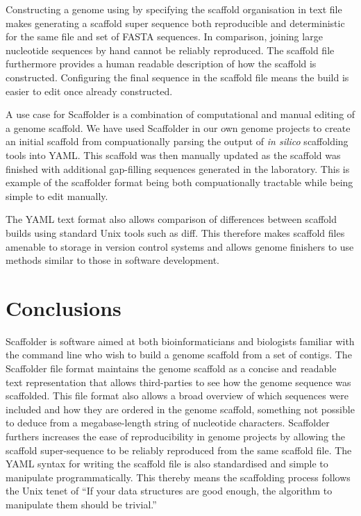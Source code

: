 \documentclass[10pt]{bmc_article}
\newenvironment{bmcformat}{\begin{raggedright}\baselineskip20pt\sloppy\setboolean{publ}{false}}{\end{raggedright}\baselineskip20pt\sloppy}
\begin{document}
\begin{bmcformat}
Constructing a genome using by specifying the scaffold organisation in text
file makes generating a scaffold super sequence both reproducible and
deterministic for the same file and set of FASTA sequences. In comparison,
joining large nucleotide sequences by hand cannot be reliably reproduced. The
scaffold file furthermore provides a human readable description of how the
scaffold is constructed. Configuring the final sequence in the scaffold file
means the build is easier to edit once already constructed. \pb

A use case for Scaffolder is a combination of computational and manual editing
of a genome scaffold. We have used Scaffolder in our own genome projects to
create an initial scaffold from compuationally parsing the output of \emph{in
silico} scaffolding tools into YAML. This scaffold was then manually updated as
the scaffold was finished with additional gap-filling sequences generated in
the laboratory. This is example of the scaffolder format being both
compuationally tractable while being simple to edit manually. \pb

The YAML text format also allows comparison of differences between scaffold
builds using standard Unix tools such as diff. This therefore makes scaffold
files amenable to storage in version control systems and allows genome
finishers to use methods similar to those in software development. \pb 

\clearpage

\section*{Conclusions} %

Scaffolder is software aimed at both bioinformaticians and biologists familiar
with the command line who wish to build a genome scaffold from a set of
contigs. The Scaffolder file format maintains the genome scaffold as a concise
and readable text representation that allows third-parties to see how the
genome sequence was scaffolded. This file format also allows a broad overview
of which sequences were included and how they are ordered in the genome
scaffold, something not possible to deduce from a megabase-length string of
nucleotide characters. Scaffolder furthers increases the ease of
reproducibility in genome projects by allowing the scaffold super-sequence to
be reliably reproduced from the same scaffold file. The YAML syntax for writing
the scaffold file is also standardised and simple to manipulate
programmatically. This thereby means the scaffolding process follows the Unix
tenet of ``If your data structures are good enough, the algorithm to manipulate
them should be trivial.''


\end{bmcformat}
\end{document}
